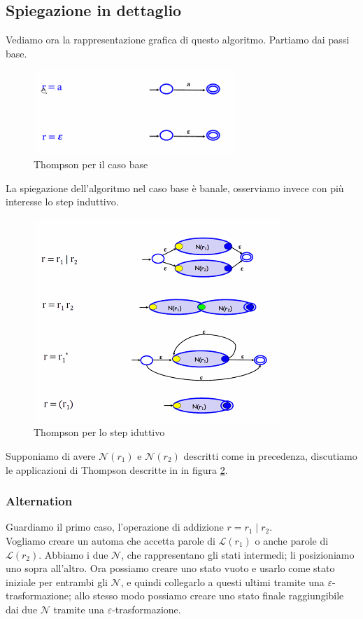 \documentclass[class=book, crop=false, oneside, 12pt]{standalone}
\begin{document}
\subsection{Spiegazione in dettaglio}
Vediamo ora la rappresentazione grafica di questo algoritmo. Partiamo dai passi base.

\begin{figure}
    \centering
    \includegraphics[width=.5\textwidth,keepaspectratio]{Thompson_base}
    \caption{Thompson per il caso base}
    \label{Thompson_base}
\end{figure}

\noindent La spiegazione dell'algoritmo nel caso base è banale, osserviamo invece con più interesse lo step induttivo.

\begin{figure}
    \centering
    \includegraphics[width=.7\textwidth,keepaspectratio]{Thompson_step}
    \caption{Thompson per lo step iduttivo}
    \label{Thompson_step}
\end{figure}
Supponiamo di avere \(\mathcal{N}(r_1)\) e \(\mathcal{N}(r_2)\) descritti come in precedenza, discutiamo le applicazioni di Thompson descritte in in figura \ref{Thompson_step}.

\subsubsection{Alternation}
Guardiamo il primo caso, l'operazione di addizione \(r = r_1 \mid r_2\).\\
Vogliamo creare un automa che accetta parole di \(\mathcal{L}(r_1)\) o anche parole di \(\mathcal{L}(r_2)\).
Abbiamo i due \(\mathcal{N}\), che rappresentano gli stati intermedi; li posizioniamo uno sopra all’altro. Ora possiamo creare uno stato vuoto e usarlo come stato iniziale per entrambi gli \(\mathcal{N}\), e quindi collegarlo a questi ultimi tramite una \(\varepsilon\)-trasformazione; allo stesso modo possiamo creare uno stato finale raggiungibile dai due \(\mathcal{N}\) tramite una \(\varepsilon\)-trasformazione.
\end{document}

